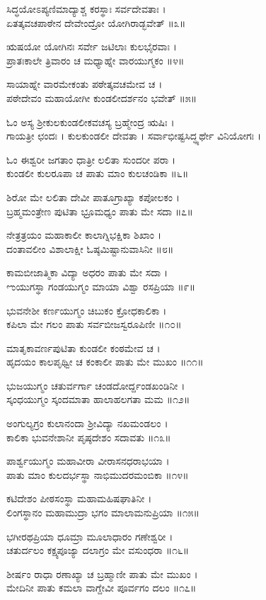 ಸಿದ್ಧಯೋಽಪ್ಯಣಿಮಾದ್ಯಾಶ್ಚ ಕರಸ್ಥಾಃ ಸರ್ವದೇವತಾಃ ।\\
ಏತತ್ಕವಚಪಾಠೇನ ದೇವೇಂದ್ರೋ ಯೋಗಿರಾಡ್ಭವೇತ್ ॥೩॥

ಋಷಯೋ ಯೋಗಿನಃ ಸರ್ವೇ ಜಟಿಲಾಃ ಕುಲಭೈರವಾಃ ।\\
ಪ್ರಾತಃಕಾಲೇ ತ್ರಿವಾರಂ ಚ ಮಧ್ಯಾಹ್ನೇ ವಾರಯುಗ್ಮಕಂ ॥೪॥

ಸಾಯಾಹ್ನೇ ವಾರಮೇಕಂತು ಪಠೇತ್ಕವಚಮೇವ ಚ ।\\
ಪಠೇದೇವಂ ಮಹಾಯೋಗೀ ಕುಂಡಲೀದರ್ಶನಂ ಭವೇತ್ ॥೫॥

ಓಂ ಅಸ್ಯ ಶ್ರೀಕುಲಕುಂಡಲೀಕವಚಸ್ಯ ಬ್ರಹ್ಮೇಂದ್ರ ಋಷಿಃ ।\\
ಗಾಯತ್ರೀ ಛಂದಃ । ಕುಲಕುಂಡಲೀ ದೇವತಾ । ಸರ್ವಾಭೀಷ್ಟಸಿದ್ಧ್ಯರ್ಥೇ ವಿನಿಯೋಗಃ ।

ಓಂ ಈಶ್ವರೀ ಜಗತಾಂ ಧಾತ್ರೀ ಲಲಿತಾ ಸುಂದರೀ ಪರಾ ।\\
ಕುಂಡಲೀ ಕುಲರೂಪಾ ಚ ಪಾತು ಮಾಂ ಕುಲಚಂಡಿಕಾ ॥೬॥

ಶಿರೋ ಮೇ ಲಲಿತಾ ದೇವೀ ಪಾತೂಗ್ರಾಖ್ಯಾ ಕಪೋಲಕಂ ।\\
ಬ್ರಹ್ಮಮಂತ್ರೇಣ ಪುಟಿತಾ ಭ್ರೂಮಧ್ಯಂ ಪಾತು ಮೇ ಸದಾ ॥೭॥

ನೇತ್ರತ್ರಯಂ ಮಹಾಕಾಲೀ ಕಾಲಾಗ್ನಿಭಕ್ಷಿಕಾ ಶಿಖಾಂ ।\\
ದಂತಾವಲೀಂ ವಿಶಾಲಾಕ್ಷೀ ಓಷ್ಠಮಿಷ್ಟಾನುವಾಸಿನೀ ॥೮॥

ಕಾಮಬೀಜಾತ್ಮಿಕಾ ವಿದ್ಯಾ ಅಧರಂ ಪಾತು ಮೇ ಸದಾ ।\\
ಌಯುಗಸ್ಥಾ ಗಂಡಯುಗ್ಮಂ ಮಾಯಾ ವಿಶ್ವಾ ರಸಪ್ರಿಯಾ ॥೯॥

ಭುವನೇಶೀ ಕರ್ಣಯುಗ್ಮಂ ಚಿಬುಕಂ ಕ್ರೋಧಕಾಲಿಕಾ ।\\
ಕಪಿಲಾ ಮೇ ಗಲಂ ಪಾತು ಸರ್ವಬೀಜಸ್ವರೂಪಿಣೀ ॥೧೦॥

ಮಾತೃಕಾವರ್ಣಪುಟಿತಾ ಕುಂಡಲೀ ಕಂಠಮೇವ ಚ ।\\
ಹೃದಯಂ ಕಾಲಪೃಥ್ವೀ ಚ ಕಂಕಾಲೀ ಪಾತು ಮೇ ಮುಖಂ ॥೧೧॥

ಭುಜಯುಗ್ಮಂ ಚತುರ್ವರ್ಗಾ ಚಂಡದೋರ್ದ್ದಂಡಖಂಡಿನೀ ।\\
ಸ್ಕಂಧಯುಗ್ಮಂ ಸ್ಕಂದಮಾತಾ ಹಾಲಾಹಲಗತಾ ಮಮ ॥೧೨॥

ಅಂಗುಲ್ಯಗ್ರಂ ಕುಲಾನಂದಾ ಶ್ರೀವಿದ್ಯಾ ನಖಮಂಡಲಂ ।\\
ಕಾಲಿಕಾ ಭುವನೇಶಾನೀ ಪೃಷ್ಠದೇಶಂ ಸದಾವತು ॥೧೩॥

ಪಾರ್ಶ್ವಯುಗ್ಮಂ ಮಹಾವೀರಾ ವೀರಾಸನಧರಾಭಯಾ ।\\
ಪಾತು ಮಾಂ ಕುಲದರ್ಭಸ್ಥಾ ನಾಭಿಮುದರಮಂಬಿಕಾ ॥೧೪॥

ಕಟಿದೇಶಂ ಪೀಠಸಂಸ್ಥಾ ಮಹಾಮಹಿಷಘಾತಿನೀ ।\\
ಲಿಂಗಸ್ಥಾನಂ ಮಹಾಮುದ್ರಾ ಭಗಂ ಮಾಲಾಮನುಪ್ರಿಯಾ ॥೧೫॥

ಭಗೀರಥಪ್ರಿಯಾ ಧೂಮ್ರಾ ಮೂಲಾಧಾರಂ ಗಣೇಶ್ವರೀ ।\\
ಚತುರ್ದಲಂ ಕಕ್ಷ್ಯಪೂಜ್ಯಾ ದಲಾಗ್ರಂ ಮೇ ವಸುಂಧರಾ ॥೧೬॥

ಶೀರ್ಷಂ ರಾಧಾ ರಣಾಖ್ಯಾ ಚ ಬ್ರಹ್ಮಾಣೀ ಪಾತು ಮೇ ಮುಖಂ ।\\
ಮೇದಿನೀ ಪಾತು ಕಮಲಾ ವಾಗ್ದೇವೀ ಪೂರ್ವಗಂ ದಲಂ ॥೧೭॥

